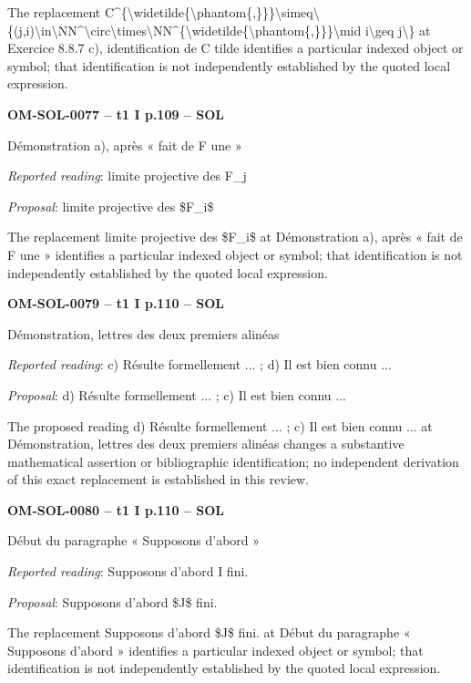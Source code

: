 The replacement C\textasciicircum{}\{\textbackslash{}widetilde\{\textbackslash{}phantom\{,\}\}\}\textbackslash{}simeq\textbackslash{}\{(j,i)\textbackslash{}in\textbackslash{}NN\textasciicircum{}\textbackslash{}circ\textbackslash{}times\textbackslash{}NN\textasciicircum{}\{\textbackslash{}widetilde\{\textbackslash{}phantom\{,\}\}\}\textbackslash{}mid i\textbackslash{}geq j\textbackslash{}\} at Exercice 8.8.7 c), identification de C tilde identifies a particular indexed object or symbol; that identification is not independently established by the quoted local expression.\par
\par\noindent\textbf{OM-SOL-0077 -- t1 I p.109 -- SOL}\par
Démonstration a), après « fait de F une »\par
\emph{Reported reading}: limite projective des F\_j\par
\emph{Proposal}: limite projective des \$F\_i\$\par
The replacement limite projective des \$F\_i\$ at Démonstration a), après « fait de F une » identifies a particular indexed object or symbol; that identification is not independently established by the quoted local expression.\par
\par\noindent\textbf{OM-SOL-0079 -- t1 I p.110 -- SOL}\par
Démonstration, lettres des deux premiers alinéas\par
\emph{Reported reading}: c) Résulte formellement ... ; d) Il est bien connu ...\par
\emph{Proposal}: d) Résulte formellement ... ; c) Il est bien connu ...\par
The proposed reading d) Résulte formellement ... ; c) Il est bien connu ... at Démonstration, lettres des deux premiers alinéas changes a substantive mathematical assertion or bibliographic identification; no independent derivation of this exact replacement is established in this review.\par
\par\noindent\textbf{OM-SOL-0080 -- t1 I p.110 -- SOL}\par
Début du paragraphe « Supposons d’abord »\par
\emph{Reported reading}: Supposons d'abord I fini.\par
\emph{Proposal}: Supposons d'abord \$J\$ fini.\par
The replacement Supposons d'abord \$J\$ fini. at Début du paragraphe « Supposons d’abord » identifies a particular indexed object or symbol; that identification is not independently established by the quoted local expression.\par
